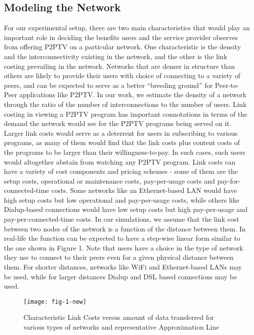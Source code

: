 \documentclass[conference,a4paper]{IEEEtran}
\begin{document}
\subsection{Modeling the Network}
\label{sec:modeling-network}
For our experimental setup, there are two main characteristics that would play an important role in deciding the benefits users and the service provider observes from offering P2PTV on a particular network. One characteristic is the density and the interconnectivity existing in the network, and the other is the link costing prevailing in the network. Networks that are denser in structure than others are likely to provide their users with choice of connecting to a variety of peers, and can be expected to serve as a better ``breeding ground'' for Peer-to-Peer applications like P2PTV. In our work, we estimate the density of a network through the ratio of the number of interconnections to the number of users. Link costing in viewing a P2PTV program has important connotations in terms of the demand the network would see for the P2PTV programs being served on it. Larger link costs would serve as a deterrent for users in subscribing to various programs, as many of them would find that the link costs plus content costs of the programs to be larger than their willingness-to-pay. In such cases, such users would altogether abstain from watching any P2PTV program. Link costs can have a variety of cost components and pricing schemes - some of them are the setup costs, operational or maintenance costs, pay-per-usage costs and pay-for-connected-time costs. Some networks like an Ethernet-based LAN would have high setup costs but low operational and pay-per-usage costs, while others like Dialup-based connections would have low setup costs but high pay-per-usage and pay-per-connected-time costs. In our simulations, we assume that the link cost between two nodes of the network is a function of the distance between them. In real-life the function can be expected to have a step-wise linear form similar to the one shown in Figure 1. Note that users have a choice in the type of network they use to connect to their peers even for a given physical distance between them. For shorter distances, networks like WiFi and Ethernet-based LANs may be used, while for larger distances Dialup and DSL based connections may be used. 

\begin{figure}
  \texttt{[image: fig-1-new]}
  \caption{Characteristic Link Costs versus amount of data transferred for various types of networks and representative Approximation Line}
  \label{fig:characteristic-link-cost}
\end{figure}
\end{document}
